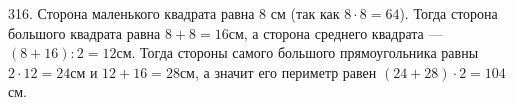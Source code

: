 316. Сторона маленького квадрата равна 8 см (так как $8\cdot8=64$). Тогда сторона большого квадрата равна $8+8=16$см, а сторона среднего квадрата --- $(8+16):2=12$см. Тогда стороны самого большого прямоугольника равны $2\cdot12=24$см и $12+16=28$см, а значит его периметр равен $(24+28)\cdot2=104$см.\\

